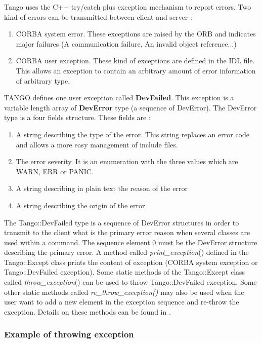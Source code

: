 Tango uses the C++ try/catch plus exception mechanism
to report errors. Two kind of errors can be transmitted between client
and server :
\begin{enumerate}
\item CORBA system error. These exceptions are raised by the ORB and indicates
major failures (A communication failure, An invalid object reference...)
\item CORBA user exception. These kind of exceptions are defined in the
IDL file. This allows an exception to contain an arbitrary amount
of error information of arbitrary type.
\end{enumerate}
TANGO defines one user exception called \textbf{DevFailed}.
This exception is a variable length array of \textbf{DevError}
type (a sequence of DevError). The DevError type is a four fields
structure. These fields are :
\begin{enumerate}
\item A string describing the type of the error. This string replaces an
error code and allows a more easy management of include files.
\item The error severity. It is an enumeration with the three values which
are WARN, ERR or PANIC.
\item A string describing in plain text the reason of the error
\item A string describing the origin of the error
\end{enumerate}
The Tango::DevFailed type is a sequence of DevError structures in
order to transmit to the client what is the primary error reason when
several classes are used within a command. The sequence element 0
must be the DevError structure describing the primary error. A method
called \emph{print\_exception}() defined in
the Tango::Except class prints the content of exception
(CORBA system exception or Tango::DevFailed exception). Some static
methods of the Tango::Except class called \emph{throw\_exception}()
can be used to throw Tango::DevFailed exception. Some other static
methods called \emph{re\_throw\_exception()}
may also be used when the user want to add a new element in the exception
sequence and re-throw the exception. Details on these methods can
be found in \cite{TANGO_ref_man}.


\subsubsection{Example of throwing exception}

